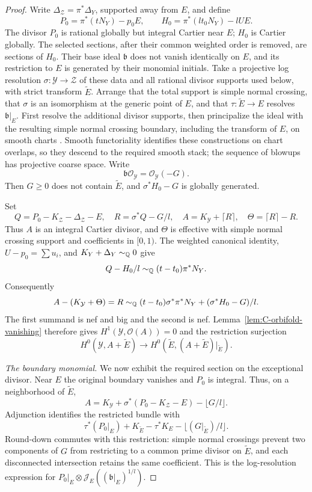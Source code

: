 \begin{proof}
Write $\Delta_{\mathcal Z}=\pi^*\Delta_Y$, supported away from $E$,
and define
\[
 P_0=\pi^*(tN_Y)-p_0E,\qquad
 H_0=\pi^*(lt_0N_Y)-lUE.
\]
The divisor $P_0$ is rational globally but integral Cartier near $E$;
$H_0$ is Cartier globally.  The selected sections, after their common
weighted order is removed, are sections of $H_0$.  Their base ideal
$\mathfrak b$ does not vanish identically on $E$, and its restriction
to $E$ is generated by their monomial initials.  Take a projective
log resolution $\sigma:\mathcal Y\to\mathcal Z$ of these data and
all rational divisor supports used below, with strict transform
$\widetilde E$.  Arrange that the total support is simple normal
crossing, that $\sigma$ is an isomorphism at the generic point of
$E$, and that $\tau:\widetilde E\to E$ resolves $\mathfrak b|_E$.
First resolve the additional divisor supports, then principalize the
ideal with the resulting simple normal crossing boundary, including
the transform of $E$, on smooth charts
\cite[Theorems~2.4.1--2.4.3]{WlodarczykResolution}.  Smooth functoriality
identifies these constructions on chart overlaps, so they descend to
the required smooth stack; the sequence of blowups has projective
coarse space.  Write
\[
 \mathfrak b\mathcal O_{\mathcal Y}=\mathcal O_{\mathcal Y}(-G).
\]
Then $G\ge0$ does not contain $\widetilde E$, and
$\sigma^*H_0-G$ is globally generated.

Set
\[
 Q=P_0-K_{\mathcal Z}-\Delta_{\mathcal Z}-E,
 \quad R=\sigma^*Q-G/l,
 \quad A=K_{\mathcal Y}+\lceil R\rceil,
 \quad\Theta=\lceil R\rceil-R.
\]
Thus $A$ is an integral Cartier divisor, and $\Theta$ is effective
with simple normal crossing support and coefficients in $[0,1)$.
The weighted canonical identity, $U-p_0=\sum u_i$, and
$K_Y+\Delta_Y\sim_{\mathbb Q}0$ give
\[
 Q-H_0/l\sim_{\mathbb Q}(t-t_0)\pi^*N_Y.
\]
Consequently
\[
 A-(K_{\mathcal Y}+\Theta)=R
 \sim_{\mathbb Q}
 (t-t_0)\sigma^*\pi^*N_Y+(\sigma^*H_0-G)/l.
\]
The first summand is nef and big and the second is nef.  Lemma~\ref{lem:C-orbifold-vanishing} therefore gives $H^1(\mathcal Y,\mathcal O(A))=0$ and
the restriction surjection
\[
 H^0(\mathcal Y,A+\widetilde E)
 \longrightarrow
 H^0(\widetilde E,(A+\widetilde E)|_{\widetilde E}).
\]

\medskip
\noindent\emph{The boundary monomial.}
We now exhibit the required section on the exceptional divisor.
Near $E$ the original
boundary vanishes and $P_0$ is integral.  Thus, on a neighborhood of
$\widetilde E$,
\[
 A=K_{\mathcal Y}
   +\sigma^*(P_0-K_{\mathcal Z}-E)-\lfloor G/l\rfloor.
\]
Adjunction identifies the restricted bundle with
\[
 \tau^*(P_0|_E)+K_{\widetilde E}-\tau^*K_E
                   -\lfloor(G|_{\widetilde E})/l\rfloor.
\]
Round-down commutes with this restriction: simple normal crossings
prevent two components of $G$ from restricting to a common prime
divisor on $\widetilde E$, and each disconnected intersection retains
the same coefficient.  This is the log-resolution expression for
$P_0|_E\otimes\mathcal J_E((\mathfrak b|_E)^{1/l})$.


\end{proof}
